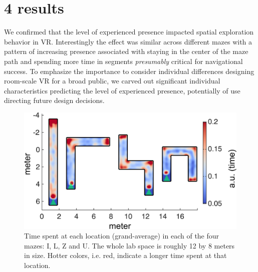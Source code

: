 \section{4 results}
We confirmed that the level of experienced presence impacted spatial exploration behavior in VR. Interestingly the effect was similar across different mazes with a pattern of increasing presence associated with staying in the center of the maze path and spending more time in segments \textit{presumably} critical for navigational success. To emphasize the importance to consider individual differences designing room-scale VR for a broad public, we carved out significant individual characteristics predicting the level of experienced presence, potentially of use directing future design decisions.
\begin{figure}[!t]
\centering
\includegraphics[width=\linewidth]{figures/head_loc_mean.pdf}
\caption{Time spent at each location (grand-average) in each of the four mazes: I, L, Z and U. The whole lab space is roughly 12 by 8 meters in size. Hotter colors, i.e. red, indicate a longer time spent at that location.}
\label{head_loc_mean}
\end{figure}